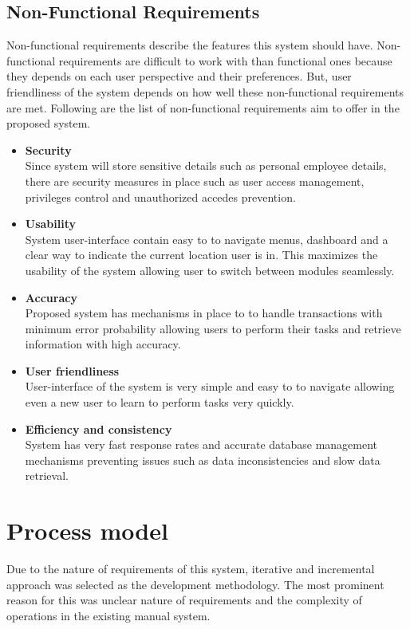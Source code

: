 \documentclass[12pt]{report}
\begin{document}
\subsection{Non-Functional Requirements}
Non-functional requirements describe the features this system should have. Non-functional requirements are difficult to work with than functional ones because they depends on each user perspective and their preferences. But, user friendliness of the system depends on how well these non-functional requirements are met.  Following are the list of non-functional requirements aim to offer in the proposed system.

\begin{itemize}
	\item {\bf{Security}}\\
	      Since system will store sensitive details such as personal employee details, there are security measures in place such as user access management, privileges control and unauthorized accedes prevention.

	\item {\bf{Usability}}\\
	      System user-interface contain easy to to navigate menus, dashboard and a clear way to indicate the current location user is in. This maximizes the usability of the system allowing user to switch between modules seamlessly.

	\item {\bf{Accuracy}}\\
	      Proposed system has mechanisms in place to to handle transactions with minimum error probability allowing users to perform their tasks and retrieve information with high accuracy.

	\item {\bf{User friendliness}}\\
	      User-interface of the system is very simple and easy to to navigate allowing even a new user to learn to perform tasks very quickly.

	\item {\bf{Efficiency and consistency}}\\
	      System has very fast response rates and accurate database management mechanisms preventing issues such as data inconsistencies and slow data retrieval.
\end{itemize}

\section{Process model}
Due to the nature of requirements of this system, iterative and incremental approach was selected as the development methodology. The most prominent reason for this was unclear nature of requirements and the complexity of operations in the existing manual system.
\end{document}
